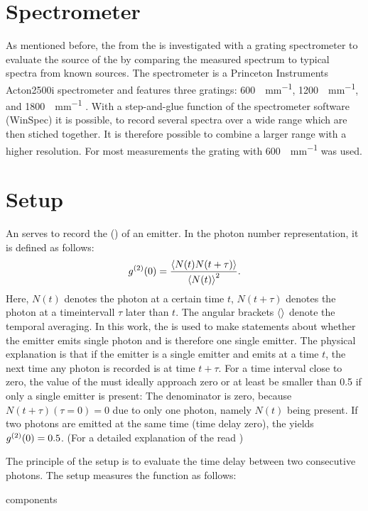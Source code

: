 	\section[Spectrometer]{Spectrometer}

		As mentioned before, the \fl from the \sivs is investigated with a grating spectrometer to evaluate the source of the \fl by comparing the measured spectrum to typical spectra from known sources.
		The spectrometer is a Princeton Instruments Acton2500i  spectrometer and features three gratings: \SI[per-mode=symbol]{600}{\lines\per\mm}, \SI[per-mode=symbol]{1200}{\lines\per\mm}, and \SI[per-mode=symbol]{1800}{\lines\per\mm} .
		With a step-and-glue function of the spectrometer software (WinSpec) it is possible, to record several spectra over a wide \wl range which are then stiched together.
		It is therefore possible to combine a larger \wl range with a higher resolution.
		For most measurements the grating with \SI[per-mode=symbol]{600}{\lines\per\mm} was used. 

	\section[HBT]{\HBT Setup}

		An  serves to record the  () of an emitter.
		In the photon number representation, it is defined as follows:
		\[
		g^{(2)}(0) = \frac{ \left\langle  N(t) N(t+\tau) \right\rangle }{\left\langle N(t)\right\rangle^2}.
		\]
		Here, $N(t)$ denotes the photon at a certain time $t$, $N(t+\tau)$ denotes the photon at a timeintervall $\tau$ later than $t$.
		The angular brackets $\left\langle \right\rangle$ denote the temporal averaging.
		In this work, the \gtf is used to make statements about whether the emitter emits single photon and is therefore one single emitter.
		The physical explanation is  that if the emitter is a single emitter and emits at a time $t$, the next time any photon is recorded is at time $t+\tau$.
		For a time interval close to zero, the value of the \gtf must ideally approach zero or at least be smaller than \num{0.5} if only a single emitter is present:
		The denominator is zero, because $N(t + \tau) (\tau = 0)=0$ due to only one photon, namely $N(t)$ being present.
		If two photons are emitted at the same time (time delay zero), the \gtf yields $g^{(2)}(0)=0.5$. 
		(For a detailed explanation of the \gtf read \cite{fox})

		The principle of the \hbt setup is to evaluate the time delay between two consecutive photons. 
		The \hbt setup measures the \gt function as follows:
		
		components




